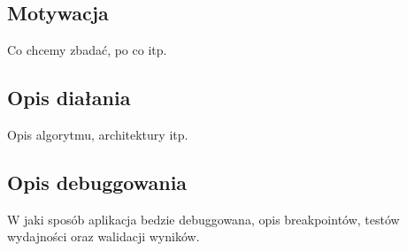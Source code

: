 \subsection{Motywacja}

Co chcemy zbadać, po co itp.

\subsection{Opis diałania}

Opis algorytmu, architektury itp.

\subsection{Opis debuggowania}

W jaki sposób aplikacja bedzie debuggowana, opis breakpointów, testów wydajności oraz walidacji wyników.